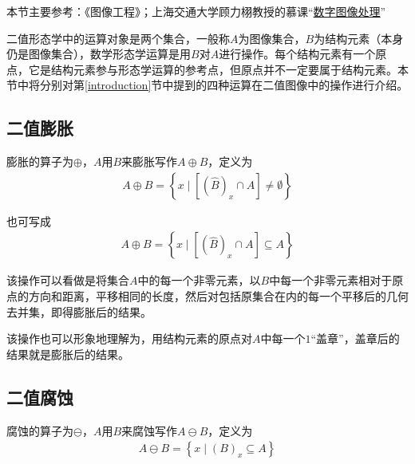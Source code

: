 \documentclass[UTF8]{ctexart}
\begin{document}
        \indent 本节主要参考：《图像工程》\cite{zhang2005图像工程}；上海交通大学顾力栩教授的慕课“\href{https://www.icourse163.org/course/0809SJTU012-1003381021}{数字图像处理}”
        
        
        \indent 二值形态学中的运算对象是两个集合，一般称$A$为图像集合，$B$为结构元素（本身仍是图像集合），数学形态学运算是用$B$对$A$进行操作。每个结构元素有一个原点，它是结构元素参与形态学运算的参考点，但原点并不一定要属于结构元素。本节中将分别对第\ref{introduction}节中提到的四种运算在二值图像中的操作进行介绍。
        
        
            \subsection{二值膨胀}
                \indent 膨胀的算子为$\oplus$，$A$用$B$来膨胀写作$A \oplus B$，定义为  
                    \begin{align}
                        A \oplus B = \left\{ x \mid \left[ \left( \hat{B} \right)_x \cap A  \right] \neq \emptyset \right\}
                    \end{align} 
                    
                    也可写成
                    \begin{align}
                        A \oplus B = \left\{ x \mid \left[ \left( \hat{B} \right)_x \cap A  \right] \subseteq A \right\}
                    \end{align}                        
                    
                \indent 该操作可以看做是将集合$A$中的每一个非零元素，以$B$中每一个非零元素相对于原点的方向和距离，平移相同的长度，然后对包括原集合在内的每一个平移后的几何去并集，即得膨胀后的结果。
                
                \indent 该操作也可以形象地理解为，用结构元素的原点对$A$中每一个$1$“盖章”，盖章后的结果就是膨胀后的结果。
                

                
            \subsection{二值腐蚀}
                
                \indent 腐蚀的算子为$\ominus$，$A$用$B$来腐蚀写作$A \ominus B$，定义为
                    \begin{align}
                        A \ominus B = \left\{ x \mid \left( B \right)_x \subseteq A \right\}
                    \end{align}                      
                    
\end{document}
